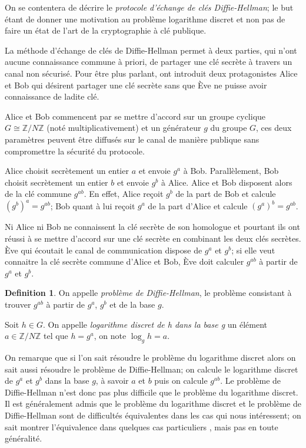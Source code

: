 \documentclass[a4paper]{article}
\theoremstyle{definition}
\newtheorem{definition}{Definition}[section]
\theoremstyle{remark}
\numberwithin{equation}{section}
\begin{document}
On se contentera de décrire le \emph{protocole d'échange de clés Diffie-Hellman}; le but étant de donner une motivation au problème logarithme discret et non pas de faire un état de l'art de la cryptographie à clé publique.

La méthode d'échange de clés de Diffie-Hellman permet à deux parties, qui n'ont aucune connaissance commune à priori, de partager une clé secrète à travers un canal non sécurisé. Pour être plus parlant, ont introduit deux protagonistes Alice et Bob qui désirent partager une clé secrète sans que Ève ne puisse avoir connaissance de ladite clé.

Alice et Bob commencent par se mettre d'accord sur un groupe cyclique $G \cong \mathbb{Z}/N\mathbb{Z}$ (noté multiplicativement) et un générateur $g$ du groupe $G$, ces deux paramètres peuvent être diffusés sur le canal de manière publique sans compromettre la sécurité du protocole.

Alice choisit secrètement un entier $a$ et envoie $g^a$ à Bob. Parallèlement, Bob choisit secrètement un entier $b$ et envoie $g^b$ à Alice. Alice et Bob disposent alors de la clé commune $g^{ab}$. En effet, Alice reçoit $g^b$ de la part de Bob et calcule $(g^b)^a = g^{ab}$; Bob quant à lui reçoit $g^a$ de la part d'Alice et calcule $(g^a)^b = g^{ab}$.

Ni Alice ni Bob ne connaissent la clé secrète de son homologue et pourtant ils ont réussi à se mettre d'accord sur une clé secrète en combinant les deux clés secrètes. Ève qui écoutait le canal de communication dispose de $g^a$ et $g^b$; si elle veut connaitre la clé secrète commune d'Alice et Bob, Ève doit calculer $g^{ab}$ à partir de $g^a$ et $g^b$.

\begin{definition}
On appelle \emph{problème de Diffie-Hellman}, le problème consistant à trouver $g^{ab}$ à partir de $g^a$, $g^b$ et de la base $g$.

Soit $h \in G$. On appelle \emph{logarithme discret de h dans la base g} un élément $a \in \mathbb{Z}/N\mathbb{Z}$ tel que $h=g^a$, on note $\log_g h = a$.
\end{definition}

On remarque que si l'on sait résoudre le problème du logarithme discret alors on sait aussi résoudre le problème de Diffie-Hellman; on calcule le logarithme discret de $g^a$ et $g^b$ dans la base $g$, à savoir $a$ et $b$ puis on calcule $g^{ab}$. Le problème de Diffie-Hellman n'est donc pas plus difficile que le problème du logarithme discret. Il est généralement admis que le problème du logarithme discret et le problème de Diffie-Hellman sont de difficultés équivalentes dans les cas qui nous intéressent; on sait montrer l'équivalence dans quelques cas particuliers \citep{maurer} \citep{muzereau},
mais pas en toute généralité.
\end{document}

